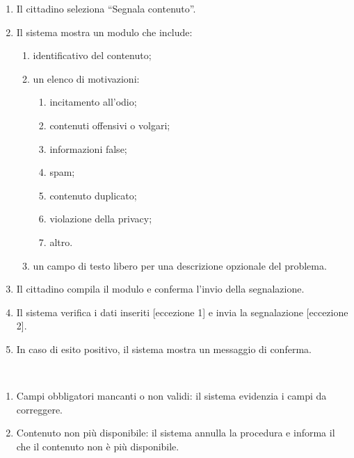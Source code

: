 \begin{ucscope}
\begin{description}
\begin{enumerate}
		\item Il cittadino seleziona ``Segnala contenuto''.

		\item Il sistema mostra un modulo che include:
		\begin{enumerate}
			\item identificativo del contenuto;

			\item un elenco di motivazioni:
			\begin{enumerate}
				\item incitamento all’odio;

				\item contenuti offensivi o volgari;

				\item informazioni false;

				\item spam;

				\item contenuto duplicato;

				\item violazione della privacy;

				\item altro.
			\end{enumerate}

			\item un campo di testo libero per una descrizione opzionale del problema.
		\end{enumerate}

		\item Il cittadino compila il modulo e conferma l’invio della segnalazione.

		\item Il sistema verifica i dati inseriti [eccezione 1] e invia la segnalazione [eccezione 2].

		\item In caso di esito positivo, il sistema mostra un messaggio di conferma.
	\end{enumerate}

	\item[Eccezioni:]~
	\begin{enumerate}
		\item Campi obbligatori mancanti o non validi: il sistema evidenzia i campi da correggere.

		\item Contenuto non più disponibile: il sistema annulla la procedura e informa il che il contenuto non è più disponibile.
	\end{enumerate}
\end{description}


\end{ucscope}
